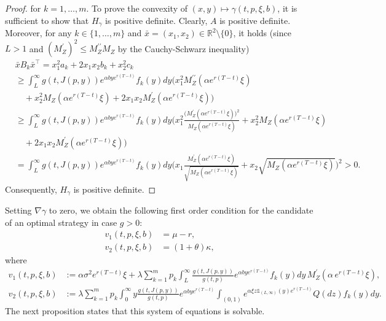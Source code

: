 \documentclass[reqno, 11pt]{amsart}%
\newcommand{\R}{\mathbb{R}}
\theoremstyle{definition}
\numberwithin{equation}{section} \numberwithin{theorem}{section}
\begin{document}
\begin{proof}
for $k=1,\ldots,m$. To prove the convexity of $(x,y)\mapsto \gamma(t,p,\xi,b)$, it is sufficient to show that $H_\gamma$ is positive definite. Clearly, $A$ is positive definite. Moreover, for any $k\in\{1,\ldots,m\}$ and $\bar{x}=(x_1,x_2)\in\R^2\setminus\{0\}$, it holds (since $L>1$ and $(M_Z^\prime)^2 \le M_Z^{\prime\prime} M_Z$ by the Cauchy-Schwarz inequality)
\begin{align*}
&\bar{x} B_k \bar{x}^\top = x_1^2 a_k + 2x_1x_2b_k + x_2^2c_k \\
 &\ge \int_L^\infty \!g(t,J(p,y))e^{\alpha b y e^{r(T-t)}}f_k(y)dy\Big(x_1^2 M_Z^{\prime\prime}(\alpha e^{r(T-t)}\xi) \\
 &\quad + x_2^2 M_Z(\alpha e^{r(T-t)}\xi) + 2x_1x_2 M_Z^\prime(\alpha e^{r(T-t)}\xi)\Big) \\
&\ge \int_L^\infty \!g(t,J(p,y))e^{\alpha b y e^{r(T-t)}}f_k(y)dy\bigg(x_1^2 \frac{\big(M_Z^{\prime}(\alpha e^{r(T-t)}\xi)\big)^2}{M_Z(\alpha e^{r(T-t)}\xi)} + x_2^2 M_Z(\alpha e^{r(T-t)}\xi) \\
&\quad + 2x_1x_2 M_Z^\prime(\alpha e^{r(T-t)}\xi)\bigg) \\
&= \int_L^\infty \!g(t,J(p,y))e^{\alpha b y e^{r(T-t)}}f_k(y)dy \bigg(x_1 \frac{M_Z^{\prime}(\alpha e^{r(T-t)}\xi)}{\sqrt{M_Z(\alpha e^{r(T-t)}\xi)}} + x_2\sqrt{M_Z(\alpha e^{r(T-t)}\xi)}\bigg)^2>0.
\end{align*}
Consequently, $H_\gamma$ is positive definite.
\end{proof}

Setting $\nabla\gamma$ to zero, we obtain the following first order condition for the candidate of an optimal strategy in case $g>0$:
\begin{equation}\label{foc}
\begin{aligned}
v_1(t,p,\xi,b) &=\mu-r, \\
v_2(t,p,\xi,b) &= (1+\theta)\kappa,
\end{aligned}
\end{equation}
where
\begin{align*}
v_1(t,p,\xi,b) &:= \alpha\sigma^2 e^{r(T-t)}\xi+ \lambda\sum_{k=1}^m p_k\int_L^\infty \frac{g(t,J(p,y))}{g(t,p)}e^{\alpha b y e^{r(T-t)}}f_k(y)dy\,M_Z^\prime(\alpha\,e^{r(T-t)}\xi),\\
v_2(t,p,\xi,b) &:= \lambda\sum_{k=1}^m p_k\int_0^\infty y\frac{g(t,J(p,y))}{g(t,p)}e^{\alpha b y e^{r(T-t)}}\int_{(0,1)} e^{\alpha\xi z\mathds{1}_{(L,\infty)}(y)e^{r(T-t)}}Q(dz)f_k(y)dy.
\end{align*}
The next proposition states that this system of equations is solvable.
\end{document}
